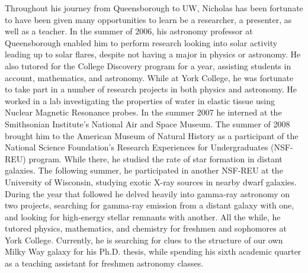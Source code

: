 Throughout his journey from Queensborough to UW, Nicholas has been fortunate to have been given many opportunities to learn be a researcher, a presenter, as well as a teacher. In the summer of 2006, his astronomy professor at Queensborough enabled him to perform research looking into solar activity leading up to solar flares, despite not having a major in physics or astronomy. He also tutored for the College Discovery program for a year, assisting students in account, mathematics, and astronomy. While at York College, he was fortunate to take part in a number of research projects in both physics and astronomy. He worked in a lab investigating the properties of water in elastic tissue using Nuclear Magnetic Resonance probes. In the summer 2007 he interned at the Smithsonian Institute's National Air and Space Museum. The summer of 2008 brought him to the American Museum of Natural History as a participant of the National Science Foundation's Research Experiences for Undergraduates (NSF-REU) program. While there, he studied the rate of star formation in distant galaxies. The following summer, he participated in another NSF-REU at the University of Wisconsin, studying exotic X-ray sources in nearby dwarf galaxies. During the year that followed he delved heavily into gamma-ray astronomy on two projects, searching for gamma-ray emission from a distant galaxy with one, and looking for high-energy stellar remnants with another. All the while, he tutored physics, mathematics, and chemistry for freshmen and sophomores at York College. Currently, he is searching for clues to the structure of our own Milky Way galaxy for his Ph.D. thesis, while spending his sixth academic quarter as a teaching assistant for freshmen astronomy classes. 


